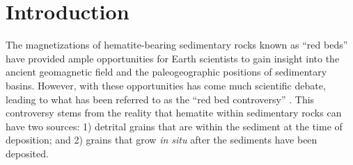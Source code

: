 \documentclass[draft]{agujournal2019}
\begin{document}

%
%
%
%


\section{Introduction}

The magnetizations of hematite-bearing sedimentary rocks known as ``red beds'' have provided ample opportunities for Earth scientists to gain insight into the ancient geomagnetic field and the paleogeographic positions of sedimentary basins. However, with these opportunities has come much scientific debate, leading to what has been referred to as the ``red bed controversy'' \cite{Butler1992a, Beck2003b, Van-Der-Voo2012a}. This controversy stems from the reality that hematite within sedimentary rocks can have two sources: 1) detrital grains that are within the sediment at the time of deposition; and 2) grains that grow \textit{in situ} after the sediments have been deposited.
\end{document}
